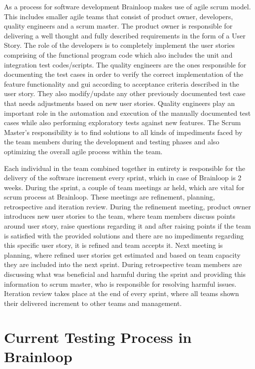 \par
As a process for software development Brainloop makes use of agile scrum model. This includes smaller agile teams that consist of product owner, developers, quality engineers and a scrum master. The product owner is responsible for delivering a well thought and fully described requirements in the form of a User Story. The role of the developers is to completely implement the user stories comprising of the functional program code which also includes the unit and integration test codes/scripts. The quality engineers are the ones responsible for documenting the test cases in order to verify the correct implementation of the feature functionality and \acrlong{gui} according to acceptance criteria described in the user story. They also modify/update any other previously documented test case that needs adjustments based on new user stories. Quality engineers play an important role in the automation and execution of the manually documented test cases while also performing exploratory tests against new features. The Scrum Master's responsibility is to find solutions to all kinds of impediments faced by the team members during the development and testing phases and also optimizing the overall agile process within the team.

\par
Each individual in the team combined together in entirety is responsible for the delivery of the software increment every sprint, which in case of Brainloop is 2 weeks. During the sprint, a couple of team meetings ar held, which are vital for scrum process at Brainloop. These meetings are refinement, planning, retrospective and iteration review. During the refinement meeting, product owner introduces new user stories to the team, where team members discuss points around user story, raise questions regarding it and after raising points if the team is satisfied with the provided solutions and there are no impediments regarding this specific user story, it is refined and team accepts it. Next meeting is planning, where refined user stories get estimated and based on team capacity they are included into the next sprint. During retrospective team members are discussing what was beneficial and harmful during the sprint and providing this information to scrum master, who is responsible for resolving harmful issues. Iteration review takes place at the end of every sprint, where all teams shown their delivered increment to other teams and management.

\section{Current Testing Process in Brainloop}

